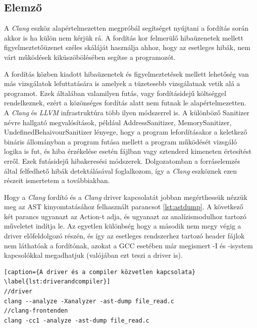 \documentclass[a4paper,12pt]{report}
\begin{document}
\subsection{Elemző}
A \emph{Clang} eszköz alapértelmezetten megpróbál segítséget nyújtani a fordítás során akkor is ha külön nem kérjük rá. A fordítás kor felmerülő hibaüzenetek mellett figyelmeztetőüzenet széles skáláját használja ahhoz, hogy az esetleges hibák, nem várt működések kiküszöbölésében segítse a programozót.

A fordítás közben kiadott hibaüzenetek és figyelmeztetések mellett lehetőség van más vizsgálatok lefuttatására is amelyek a tüzetesebb vizsgálatnak vetik alá a programot. Ezek általában valamilyen futás, vagy fordításidejű költséggel rendelkeznek, ezért a közönséges fordítás alatt nem futnak le alapértelmezetten.
A \emph{Clang} és \emph{LLVM} infrastruktúra több ilyen módszerrel is. A különböző Sanitizer névre hallgató megvalósítások, például AddressSanitizer, MemorySanitizer, UndefinedBehaivourSanitizer lényege, hogy a program lefordításakor a keletkező bináris állományban a program futása mellett a program működését vizsgáló logika is fut, és hiba érzékelése esetén fájlban vagy sztenderd kimeneten értesítést erről. Ezek futásidejű hibakeresési módszerek. Dolgozatomban a forráselemzés által felfedhető hibák detektálásával foglalkozom, így a \emph{Clang} eszköznek ezen részeit ismertetem a továbbiakban.

Hogy a \emph{Clang} fordító és a \emph{Clang} driver kapcsolatát jobban megérthessük nézzük meg az AST kinyomtatásához felhasznált parancsot \ref{lst:astdump}. A következő két parancs ugyanazt az Action-t adja, és ugyanazt az analízismodulhoz tartozó műveletet indítja le. Az egyetlen különbség hogy a második nem megy végig a driver előfeldolgozó részén, és így az esetleges rendszerhez tartozó header fájlok nem láthatóak a fordítónak, azokat a GCC esetében már megismert -I és -isystem kapcsolókkal megadhatjuk (valójában ezt teszi a driver is).

\begin{lstlisting}[caption={A driver és a compiler közvetlen kapcsolata}
\label{lst:driverandcompiler}]
//driver
clang --analyze -Xanalyzer -ast-dump file_read.c
//clang-frontenden
clang -cc1 -analyze -ast-dump file_read.c
\end{lstlisting}
\end{document}
